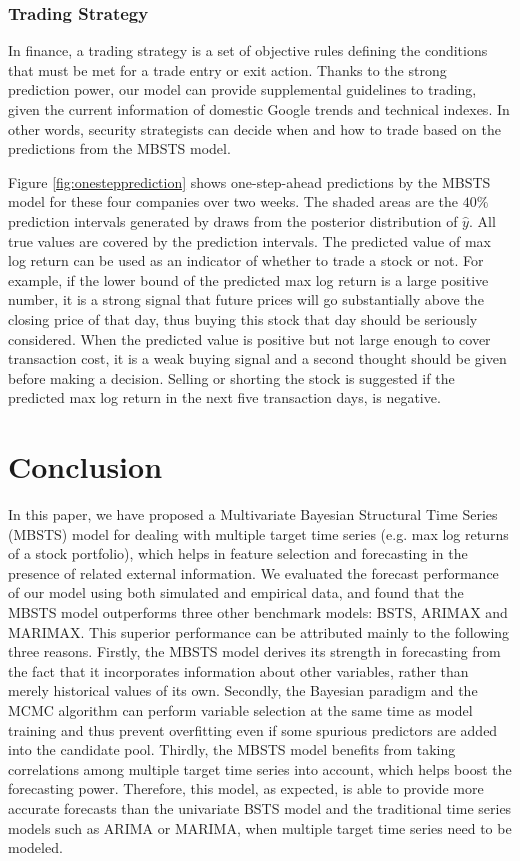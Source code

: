 \documentclass[twoside,11pt]{article}
\begin{document}
\subsubsection{Trading Strategy}


In finance, a trading strategy is a set of objective rules defining the conditions that must be met for a trade entry or exit action. Thanks to the strong prediction power, our model can provide supplemental guidelines to trading, given the current information of domestic Google trends and technical indexes. In other words, security strategists can decide when and how to trade based on the predictions from the MBSTS model.

Figure \ref{fig:onestepprediction} shows one-step-ahead predictions by the MBSTS model for these four companies over two weeks. The shaded areas are the $40\%$ prediction intervals generated by draws from the posterior distribution of $\hat{y}$. All true values are covered by the prediction intervals. The predicted value of max log return can be used as an indicator of whether to trade a stock or not. For example, if the lower bound of the predicted max log return is a large positive number, it is a strong signal that future prices will go substantially above the closing price of that day, thus buying this stock that day should be seriously considered.
When the predicted value is positive but not large enough to cover transaction cost, it is a weak buying signal and a second thought should be given before making a decision. Selling or shorting the stock is suggested if the predicted max log return in the next five transaction days, is negative.



\section{Conclusion}

In this paper, we have proposed a Multivariate Bayesian Structural Time Series (MBSTS) model for dealing with multiple target time series (e.g. max log returns of a stock portfolio), which helps in feature selection and forecasting in the presence of related external information. We evaluated the forecast performance of our model using both simulated and empirical data, and found that the MBSTS model outperforms three other benchmark models: BSTS, ARIMAX and MARIMAX.
This superior performance can be attributed mainly to the following three reasons. Firstly, the MBSTS model derives its strength in forecasting from the fact that it incorporates information about other variables, rather than merely historical values of its own. Secondly, the Bayesian paradigm and the MCMC algorithm can perform variable selection at the same time as model training and thus prevent overfitting even if some spurious predictors are added into the candidate pool. Thirdly, the MBSTS model benefits from taking correlations among multiple target time series into account, which helps boost the forecasting power.
Therefore, this model, as expected, is able to provide more accurate forecasts than the univariate BSTS model and the traditional time series models such as ARIMA or MARIMA, when multiple target time series need to be modeled.
\end{document}
